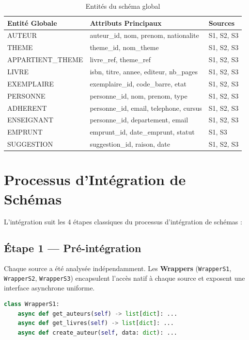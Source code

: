 \documentclass[12pt,a4paper]{article}
\begin{document}
\begin{table}[H]
\centering
\begin{tabular}{lll}
\toprule
\textbf{Entité Globale} & \textbf{Attributs Principaux} & \textbf{Sources} \\
\midrule
AUTEUR & auteur\_id, nom, prenom, nationalite & S1, S2, S3 \\
THEME & theme\_id, nom\_theme & S1, S2, S3 \\
APPARTIENT\_THEME & livre\_ref, theme\_ref & S1, S2, S3 \\
LIVRE & isbn, titre, annee, editeur, nb\_pages & S1, S2, S3 \\
EXEMPLAIRE & exemplaire\_id, code\_barre, etat & S1, S2, S3 \\
PERSONNE & personne\_id, nom, prenom, type & S1, S2, S3 \\
ADHERENT & personne\_id, email, telephone, cursus & S1, S2, S3 \\
ENSEIGNANT & personne\_id, departement, email & S1, S2, S3 \\
EMPRUNT & emprunt\_id, date\_emprunt, statut & S1, S3 \\
SUGGESTION & suggestion\_id, raison, date & S1, S2, S3 \\
\bottomrule
\end{tabular}
\caption{Entités du schéma global}
\end{table}

\section{Processus d'Intégration de Schémas}

L'intégration suit les 4 étapes classiques du processus d'intégration de schémas :

\subsection{Étape 1 — Pré-intégration}
Chaque source a été analysée indépendamment. Les \textbf{Wrappers} (\texttt{WrapperS1}, \texttt{WrapperS2}, \texttt{WrapperS3}) encapsulent l'accès natif à chaque source et exposent une interface asynchrone uniforme.

\begin{lstlisting}[language=Python, caption=Interface uniforme d'un Wrapper]
class WrapperS1:
    async def get_auteurs(self) -> list[dict]: ...
    async def get_livres(self) -> list[dict]: ...
    async def create_auteur(self, data: dict): ...
\end{lstlisting}
\end{document}
